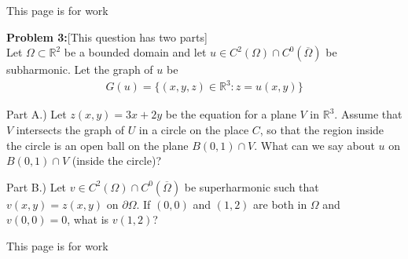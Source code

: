 \documentclass{article}
\newcommand{\R}{{\mathbb{R}}}
\newcommand{\cl}[1]{{\overline{#1}}}
\newcommand{\pd}{\partial}
\begin{document}
\newpage

This page is for work
\newpage



\textbf{Problem 3:}[This question has two parts] \\

Let $\Omega \subset \R^{2}$ be a bounded domain and let $u \in C^{2}(\Omega) \cap C^{0}(\cl{\Omega})$ be subharmonic. Let the graph of $u$ be 
\begin{align*}
	G(u) = \{(x,y,z) \in \R^{3} : z = u(x,y)\}
\end{align*}
\vspace{0.5 cm}

Part A.) Let $z(x,y) = 3x+2y$ be the equation for a plane $V$ in $\R^{3}$. Assume that $V$ intersects the graph of $U$ in a circle on the place $C$, so that the region inside the circle is an open ball on the plane $B(0,1) \cap V$. What can we say about $u$ on $B(0,1) \cap V$ (inside the circle)?


\newpage

\vspace{0.5 cm}

Part B.) Let $v \in C^{2}(\Omega) \cap C^{0}(\cl{\Omega})$ be superharmonic such that $v(x,y) = z(x,y)$ on $\pd \Omega$. If $(0,0)$ and $(1,2)$ are both in $\Omega$ and $v(0,0) = 0$, what is $v(1,2)$? 




\newpage

This page is for work
\newpage
\end{document}
